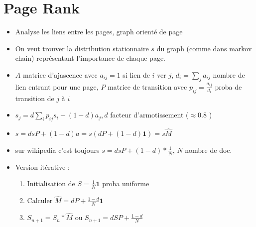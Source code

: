 \documentclass{article}
\theoremstyle{plain}%
\theoremstyle{definition}
\theoremstyle{remark}
\begin{document}
\section{Page Rank}
\begin{itemize}
    \item Analyse les liens entre les pages, graph orienté de page
    \item On veut trouver la distribution stationnaire $ s $ du graph (comme dans markov chain) représentant l'importance de chaque page.
    \item $ A $ matrice d'ajascence avec $ a_{ij} = 1$ si lien de $ i $ ver $ j $, $ d_i = \sum_{j}^{} a_{ij} $ nombre de lien entrant pour une page, $ P $ matrice de transition avec $ p_{ij} = \frac{a_{ij}}{d_i}$ proba de transition de $ j $ à $ i $ 
    \item $ s_j = d \sum_{i}^{}p_{ij} s_i + (1 - d) a_j, d$ facteur d'armotissement ($ \approx 0.8 $ )
    \item $ s = dsP + (1-d)a  = s (d P + (1 - d) \mathbf{1}) = s \hat{M}$ 
    \item sur wikipedia c'est toujours $ s = dsP + (1-d)* \frac{1}{N} $, $ N $ nombre de doc.
    \item Version itérative : \begin{enumerate}
        \item Initialisation de $ S = \frac{1}{N} \mathbf{1} $ proba uniforme
        \item Calculer $ \hat{M} = dP + \frac{1-d}{N} \mathbf{1} $ 
        \item $ S_{n+1} = S_n * \hat{M} $ ou $ S_{n+1} = d SP + \frac{1- d}{N} $  
    \end{enumerate}
\end{itemize}
\end{document}

